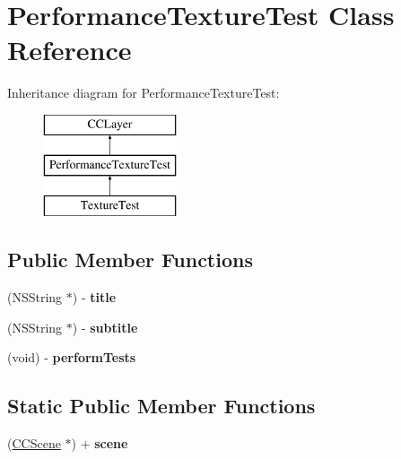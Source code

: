 \hypertarget{interface_performance_texture_test}{\section{Performance\-Texture\-Test Class Reference}
\label{interface_performance_texture_test}
}
Inheritance diagram for Performance\-Texture\-Test\-:\begin{figure}[H]
\begin{center}
\leavevmode
\includegraphics[height=3.000000cm]{interface_performance_texture_test}
\end{center}
\end{figure}
\subsection*{Public Member Functions}
\begin{DoxyCompactItemize}
\item 
\hypertarget{interface_performance_texture_test_a3007f88d8b4e002a7b6be2ded92c8c6b}{(N\-S\-String $\ast$) -\/ {\bfseries title}}\label{interface_performance_texture_test_a3007f88d8b4e002a7b6be2ded92c8c6b}

\item 
\hypertarget{interface_performance_texture_test_a1c8db04a09dfe2526d975c5eebfd66d2}{(N\-S\-String $\ast$) -\/ {\bfseries subtitle}}\label{interface_performance_texture_test_a1c8db04a09dfe2526d975c5eebfd66d2}

\item 
\hypertarget{interface_performance_texture_test_a8f6816f1262403b31280b7aacad341e9}{(void) -\/ {\bfseries perform\-Tests}}\label{interface_performance_texture_test_a8f6816f1262403b31280b7aacad341e9}

\end{DoxyCompactItemize}
\subsection*{Static Public Member Functions}
\begin{DoxyCompactItemize}
\item 
\hypertarget{interface_performance_texture_test_ad13b585fbab183a9a643019e46cfd9f0}{(\hyperlink{interface_c_c_scene}{C\-C\-Scene} $\ast$) + {\bfseries scene}}\label{interface_performance_texture_test_ad13b585fbab183a9a643019e46cfd9f0}

\end{DoxyCompactItemize}


